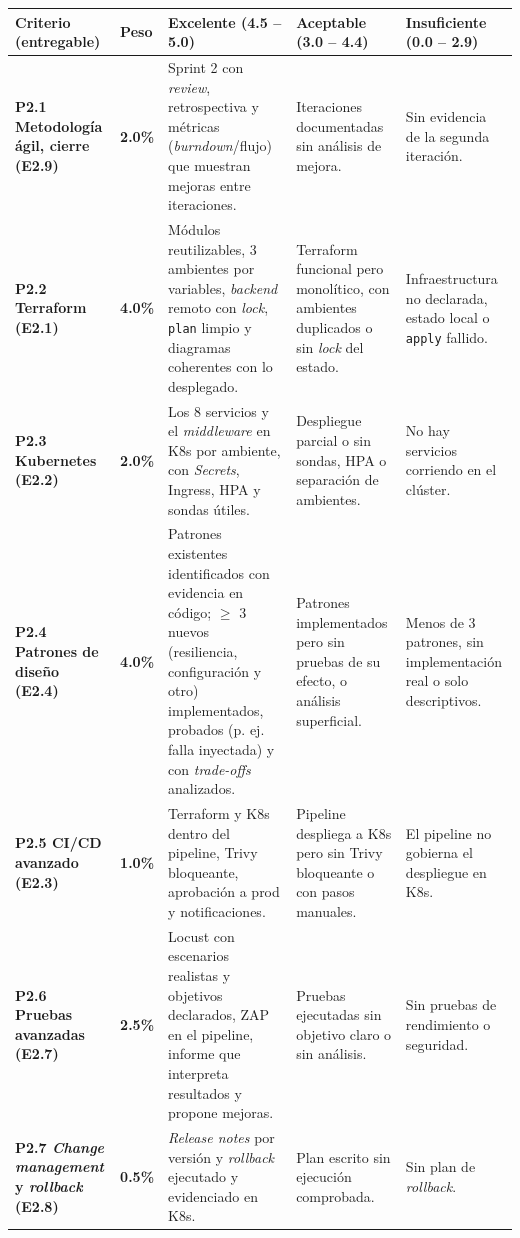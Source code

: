 \documentclass[10pt,letterpaper]{article}
\begin{document}
\fontsize{7.5}{9.5}\selectfont
\begin{longtable}{|L{2.7cm}|C{0.9cm}|L{4.35cm}|L{4.35cm}|L{4.35cm}|}
\hline
{}
\textbf{Criterio (entregable)} & \textbf{Peso} & \textbf{Excelente (4.5 -- 5.0)} & \textbf{Aceptable (3.0 -- 4.4)} & \textbf{Insuficiente (0.0 -- 2.9)} \\ \hline
\endhead
\textbf{P2.1 Metodología ágil, cierre (E2.9)} & \textbf{2.0\%} & Sprint 2 con \textit{review}, retrospectiva y métricas (\textit{burndown}/flujo) que muestran mejoras entre iteraciones. & Iteraciones documentadas sin análisis de mejora. & Sin evidencia de la segunda iteración. \\ \hline
\textbf{P2.2 Terraform (E2.1)} & \textbf{4.0\%} & Módulos reutilizables, 3 ambientes por variables, \textit{backend} remoto con \textit{lock}, \texttt{plan} limpio y diagramas coherentes con lo desplegado. & Terraform funcional pero monolítico, con ambientes duplicados o sin \textit{lock} del estado. & Infraestructura no declarada, estado local o \texttt{apply} fallido. \\ \hline
\textbf{P2.3 Kubernetes (E2.2)} & \textbf{2.0\%} & Los 8 servicios y el \textit{middleware} en K8s por ambiente, con \textit{Secrets}, Ingress, HPA y sondas útiles. & Despliegue parcial o sin sondas, HPA o separación de ambientes. & No hay servicios corriendo en el clúster. \\ \hline
\textbf{P2.4 Patrones de diseño (E2.4)} & \textbf{4.0\%} & Patrones existentes identificados con evidencia en código; $\geq$ 3 nuevos (resiliencia, configuración y otro) implementados, probados (p. ej. falla inyectada) y con \textit{trade-offs} analizados. & Patrones implementados pero sin pruebas de su efecto, o análisis superficial. & Menos de 3 patrones, sin implementación real o solo descriptivos. \\ \hline
\textbf{P2.5 CI/CD avanzado (E2.3)} & \textbf{1.0\%} & Terraform y K8s dentro del pipeline, Trivy bloqueante, aprobación a prod y notificaciones. & Pipeline despliega a K8s pero sin Trivy bloqueante o con pasos manuales. & El pipeline no gobierna el despliegue en K8s. \\ \hline
\textbf{P2.6 Pruebas avanzadas (E2.7)} & \textbf{2.5\%} & Locust con escenarios realistas y objetivos declarados, ZAP en el pipeline, informe que interpreta resultados y propone mejoras. & Pruebas ejecutadas sin objetivo claro o sin análisis. & Sin pruebas de rendimiento o seguridad. \\ \hline
\textbf{P2.7 \textit{Change management} y \textit{rollback} (E2.8)} & \textbf{0.5\%} & \textit{Release notes} por versión y \textit{rollback} ejecutado y evidenciado en K8s. & Plan escrito sin ejecución comprobada. & Sin plan de \textit{rollback}. \\ \hline

\end{longtable}
\end{document}
